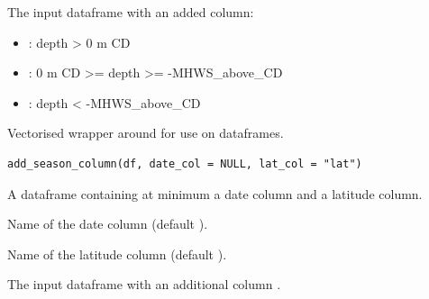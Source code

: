 \documentclass[a4paper]{book}
\begin{document}
%
\begin{Value}
The input dataframe with an added  column:
\begin{itemize}

\item{} : depth > 0 m CD
\item{} : 0 m CD >= depth >= -MHWS\_above\_CD
\item{} : depth < -MHWS\_above\_CD

\end{itemize}

\end{Value}
%
\begin{Examples}
\end{Examples}
%
\begin{Description}
Vectorised wrapper around  for use on dataframes.
\end{Description}
%
\begin{Usage}
\begin{verbatim}
add_season_column(df, date_col = NULL, lat_col = "lat")
\end{verbatim}
\end{Usage}
%
\begin{Arguments}
\begin{ldescription}
\item[\code{df}] A dataframe containing at minimum a date column and a latitude column.

\item[\code{date\_col}] Name of the date column (default ).

\item[\code{lat\_col}] Name of the latitude column (default ).
\end{ldescription}
\end{Arguments}
%
\begin{Value}
The input dataframe with an additional column .
\end{Value}
\end{document}
